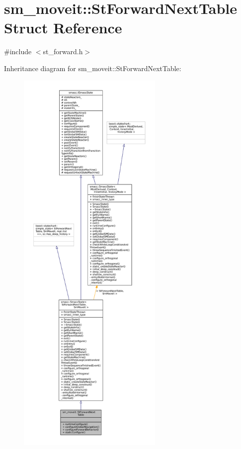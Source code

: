 \hypertarget{structsm__moveit_1_1StForwardNextTable}{}\section{sm\+\_\+moveit\+:\+:St\+Forward\+Next\+Table Struct Reference}
\label{structsm__moveit_1_1StForwardNextTable}


{\ttfamily \#include $<$st\+\_\+forward.\+h$>$}



Inheritance diagram for sm\+\_\+moveit\+:\+:St\+Forward\+Next\+Table\+:
\nopagebreak
\begin{figure}[H]
\begin{center}
\leavevmode
\includegraphics[height=550pt]{structsm__moveit_1_1StForwardNextTable__inherit__graph}
\end{center}
\end{figure}



